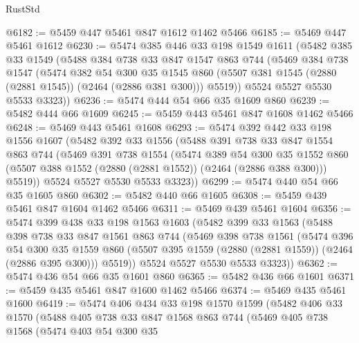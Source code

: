 \begin{lexlean}{RustStd}
\begin{coremodule}
@6182 := @5459 @447 @5461 @847 @1612 @1462 @5466
@6185 := @5469 @447 @5461 @1612
@6230 := @5474
    @385
    @446
    @33
    @198
    @1549
    @1611
    (@5482
      @385
      @33
      @1549
      (@5488
        @384
        @738
        @33
        @847
        @1547
        @863
        @744
        (@5469
          @384
          @738
          @1547
          (@5474
            @382
            @54
            @300
            @35
            @1545
            @860
            (@5507 @381 @1545 (@2880 (@2881 @1545)) (@2464 (@2886 @381 @300)))
            @5519))
        @5524
        @5527
        @5530
        @5533
        @3323))
@6236 := @5474 @444 @54 @66 @35 @1609 @860
@6239 := @5482 @444 @66 @1609
@6245 := @5459 @443 @5461 @847 @1608 @1462 @5466
@6248 := @5469 @443 @5461 @1608
@6293 := @5474
    @392
    @442
    @33
    @198
    @1556
    @1607
    (@5482
      @392
      @33
      @1556
      (@5488
        @391
        @738
        @33
        @847
        @1554
        @863
        @744
        (@5469
          @391
          @738
          @1554
          (@5474
            @389
            @54
            @300
            @35
            @1552
            @860
            (@5507 @388 @1552 (@2880 (@2881 @1552)) (@2464 (@2886 @388 @300)))
            @5519))
        @5524
        @5527
        @5530
        @5533
        @3323))
@6299 := @5474 @440 @54 @66 @35 @1605 @860
@6302 := @5482 @440 @66 @1605
@6308 := @5459 @439 @5461 @847 @1604 @1462 @5466
@6311 := @5469 @439 @5461 @1604
@6356 := @5474
    @399
    @438
    @33
    @198
    @1563
    @1603
    (@5482
      @399
      @33
      @1563
      (@5488
        @398
        @738
        @33
        @847
        @1561
        @863
        @744
        (@5469
          @398
          @738
          @1561
          (@5474
            @396
            @54
            @300
            @35
            @1559
            @860
            (@5507 @395 @1559 (@2880 (@2881 @1559)) (@2464 (@2886 @395 @300)))
            @5519))
        @5524
        @5527
        @5530
        @5533
        @3323))
@6362 := @5474 @436 @54 @66 @35 @1601 @860
@6365 := @5482 @436 @66 @1601
@6371 := @5459 @435 @5461 @847 @1600 @1462 @5466
@6374 := @5469 @435 @5461 @1600
@6419 := @5474
    @406
    @434
    @33
    @198
    @1570
    @1599
    (@5482
      @406
      @33
      @1570
      (@5488
        @405
        @738
        @33
        @847
        @1568
        @863
        @744
        (@5469
          @405
          @738
          @1568
          (@5474
            @403
            @54
            @300
            @35

\end{coremodule}
\end{lexlean}
